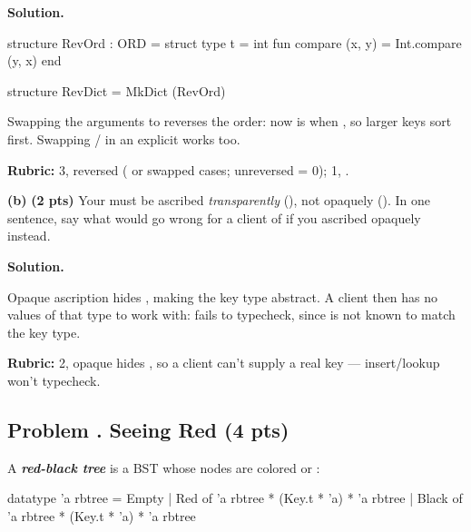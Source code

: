 \documentclass[crop=false]{standalone}
\newif\ifsol
\newenvironment{solution}
    {\par\color{solution_color}\begin{framed}\textbf{Solution.}\par}
    {\end{framed}}
\newcommand{\term}[1]{\textbf{\textit{#1}}}
\newcommand{\quizproblem}[3]{%
  \needspace{5\baselineskip}%
  \stepcounter{problem}%
  \ifsol
    \subsection*{Problem \arabic{problem}. #1 \hfill \timing{#2} \quad (#3 pts)}%
  \else
    \subsection*{Problem \arabic{problem}. #1 \hfill (#3 pts)}%
  \fi
}
\newcommand{\subpts}[1]{\textbf{(#1 pts)}}
\newcommand{\answerspace}[1]{\ifsol\else\vspace{#1}\par\fi}
\begin{document}
\answerspace{1.5cm}

\begin{solution}
\begin{codeblock}
  structure RevOrd : ORD =
    struct
      type t = int
      fun compare (x, y) = Int.compare (y, x)
    end

  structure RevDict = MkDict (RevOrd)
\end{codeblock}
Swapping the arguments to  reverses the order: now
 is  when , so larger keys
sort first. Swapping / in an explicit
 works too.

\textbf{Rubric:} 3, reversed  ( or
swapped cases; unreversed = 0); 1, .
\end{solution}

\textbf{(b)} \subpts{2} Your  must be ascribed
\emph{transparently} (\code{:}), not opaquely (\code{:>}). In one
sentence, say what would go wrong for a client of  if you
ascribed  opaquely instead.

\answerspace{3cm}

\begin{solution}
Opaque ascription hides , making the key type
abstract. A client then has no values of that type to work with:
 fails to typecheck, since  is not
known to match the key type.

\textbf{Rubric:} 2, opaque hides , so a client
can't supply a real  key --- insert/lookup won't typecheck.
\end{solution}

\newpage


\quizproblem{Seeing Red}{5}{4}

A \term{red-black tree} is a BST whose nodes are colored  or
:

\begin{codeblock}
  datatype 'a rbtree =
      Empty
    | Red   of 'a rbtree * (Key.t * 'a) * 'a rbtree
    | Black of 'a rbtree * (Key.t * 'a) * 'a rbtree
\end{codeblock}
\end{document}
